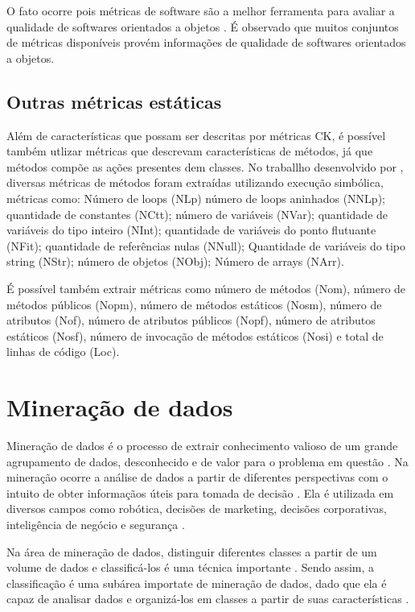 \documentclass[
	12pt,				%
	oneside,			%
	a4paper,			%
	english,			%
	brazil				%
	]{abntex2ppgsi}
\begin{document}
 O fato ocorre pois métricas de software são a melhor ferramenta para avaliar a qualidade de softwares orientados a objetos \cite{Suresh2016}. É observado que muitos conjuntos de métricas disponíveis provém informações de qualidade de softwares orientados a objetos.  \cite{Suresh2016}


\section{Outras métricas estáticas}
Além de características que possam ser descritas por métricas CK, é possível também utlizar métricas que descrevam características de métodos, já que métodos compõe as ações  presentes dem classes.  No traballho desenvolvido por \cite{Eler2016}, diversas métricas de métodos foram extraídas utilizando execução simbólica, métricas como: Número de loops (NLp) número de loops aninhados (NNLp); quantidade de constantes (NCtt); número de variáveis (NVar); quantidade de variáveis do tipo inteiro (NInt);  quantidade de variáveis do ponto flutuante (NFit); quantidade de referências nulas (NNull); Quantidade de variáveis do tipo string (NStr); número de objetos (NObj); Número de arrays (NArr).

É possível também extrair métricas como número de métodos (Nom), número de métodos públicos (Nopm), número de métodos estáticos (Nosm), número de atributos (Nof), número de atributos públicos (Nopf), número de atributos estáticos (Nosf), número de invocação de métodos estáticos (Nosi) e total de linhas de código (Loc).

\chapter{Mineração de dados}

Mineração de dados é o processo de extrair conhecimento valioso de um grande agrupamento de dados, desconhecido e de valor para o problema em questão \cite{Seth2016, sharma2015}. Na mineração ocorre a análise de dados a partir de diferentes perspectivas com o intuito de obter informaçãos úteis para tomada de decisão  \cite{ sharma2015}. Ela é utilizada em diversos campos como robótica, decisões de marketing, decisões corporativas, inteligência de negócio e segurança \cite{ Seth2016}.

Na área de mineração de dados, distinguir diferentes classes a partir de um volume de dados e classificá-los é uma técnica importante \cite{Seth2016}. Sendo assim, a classificação é uma subárea importate de mineração de dados, dado que ela é capaz de analisar dados e organizá-los em classes a partir de suas características \cite{ Seth2016}.
\end{document}
